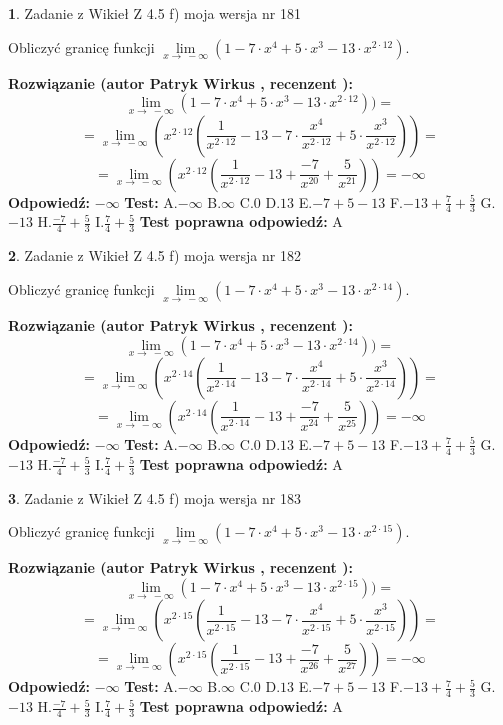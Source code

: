 \documentclass[12pt, a4paper]{article}
\theoremstyle{definition} %
\newtheorem{zad}{}
\newcommand{\zadStart}[1]{\begin{zad}#1\newline}
\newcommand{\zadStop}{\end{zad}}
\newcommand{\rozwStart}[2]{\noindent \textbf{Rozwiązanie (autor #1 , recenzent #2): }\newline}
\newcommand{\rozwStop}{\newline}
\newcommand{\odpStart}{\noindent \textbf{Odpowiedź:}\newline}
\newcommand{\odpStop}{\newline}
\newcommand{\testStart}{\noindent \textbf{Test:}\newline}
\newcommand{\testStop}{\newline}
\newcommand{\kluczStart}{\noindent \textbf{Test poprawna odpowiedź:}\newline}
\newcommand{\kluczStop}{\newline}
\begin{document}
\zadStart{Zadanie z Wikieł Z 4.5 f) moja wersja nr 181}



Obliczyć granicę funkcji  $\lim\limits_{x\to\ -\infty}(1 - 7 \cdot x^{4}+5 \cdot x^{3}- 13 \cdot x^{2\cdot12})$.
\zadStop
\rozwStart{Patryk Wirkus}{}
$$\lim\limits_{x\to\ -\infty}(1 - 7 \cdot x^{4}+5 \cdot x^{3}- 13 \cdot x^{2\cdot12}))=$$
$$=\lim\limits_{x\to\ -\infty}(x^{2\cdot12}(\frac{1}{x^{2\cdot12}}-13 -7 \cdot \frac{x^{4}}{x^{2\cdot12}}+5 \cdot \frac{x^{3}}{x^{2\cdot12}}))=$$
$$=\lim\limits_{x\to\ -\infty}(x^{2\cdot12}(\frac{1}{x^{2\cdot12}}-13 + \frac{-7}{x^{20}}+ \frac{5}{x^{21}}))=-\infty$$
\rozwStop
\odpStart
$-\infty$
\odpStop
\testStart
A.$-\infty$ B.$\infty$ C.$0$ D.$13$ E.$-7 + 5 - 13$
F.$-13+\frac{7}{4}+\frac{5}{3}$ G.$-13$
H.$\frac{-7}{4}+\frac{5}{3}$
I.$\frac{7}{4}+\frac{5}{3}$
\testStop
\kluczStart
A
\kluczStop



\zadStart{Zadanie z Wikieł Z 4.5 f) moja wersja nr 182}



Obliczyć granicę funkcji  $\lim\limits_{x\to\ -\infty}(1 - 7 \cdot x^{4}+5 \cdot x^{3}- 13 \cdot x^{2\cdot14})$.
\zadStop
\rozwStart{Patryk Wirkus}{}
$$\lim\limits_{x\to\ -\infty}(1 - 7 \cdot x^{4}+5 \cdot x^{3}- 13 \cdot x^{2\cdot14}))=$$
$$=\lim\limits_{x\to\ -\infty}(x^{2\cdot14}(\frac{1}{x^{2\cdot14}}-13 -7 \cdot \frac{x^{4}}{x^{2\cdot14}}+5 \cdot \frac{x^{3}}{x^{2\cdot14}}))=$$
$$=\lim\limits_{x\to\ -\infty}(x^{2\cdot14}(\frac{1}{x^{2\cdot14}}-13 + \frac{-7}{x^{24}}+ \frac{5}{x^{25}}))=-\infty$$
\rozwStop
\odpStart
$-\infty$
\odpStop
\testStart
A.$-\infty$ B.$\infty$ C.$0$ D.$13$ E.$-7 + 5 - 13$
F.$-13+\frac{7}{4}+\frac{5}{3}$ G.$-13$
H.$\frac{-7}{4}+\frac{5}{3}$
I.$\frac{7}{4}+\frac{5}{3}$
\testStop
\kluczStart
A
\kluczStop



\zadStart{Zadanie z Wikieł Z 4.5 f) moja wersja nr 183}



Obliczyć granicę funkcji  $\lim\limits_{x\to\ -\infty}(1 - 7 \cdot x^{4}+5 \cdot x^{3}- 13 \cdot x^{2\cdot15})$.
\zadStop
\rozwStart{Patryk Wirkus}{}
$$\lim\limits_{x\to\ -\infty}(1 - 7 \cdot x^{4}+5 \cdot x^{3}- 13 \cdot x^{2\cdot15}))=$$
$$=\lim\limits_{x\to\ -\infty}(x^{2\cdot15}(\frac{1}{x^{2\cdot15}}-13 -7 \cdot \frac{x^{4}}{x^{2\cdot15}}+5 \cdot \frac{x^{3}}{x^{2\cdot15}}))=$$
$$=\lim\limits_{x\to\ -\infty}(x^{2\cdot15}(\frac{1}{x^{2\cdot15}}-13 + \frac{-7}{x^{26}}+ \frac{5}{x^{27}}))=-\infty$$
\rozwStop
\odpStart
$-\infty$
\odpStop
\testStart
A.$-\infty$ B.$\infty$ C.$0$ D.$13$ E.$-7 + 5 - 13$
F.$-13+\frac{7}{4}+\frac{5}{3}$ G.$-13$
H.$\frac{-7}{4}+\frac{5}{3}$
I.$\frac{7}{4}+\frac{5}{3}$
\testStop
\kluczStart
A
\kluczStop
\end{document}
